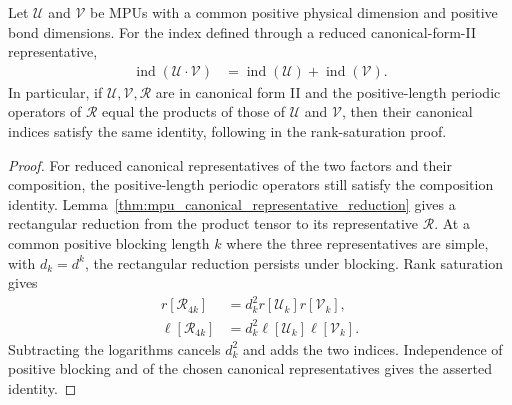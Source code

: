 \begin{lemma}
    \label{thm:mpu_admissible_index_composition}
    \leanok
    Let $\mathcal U$ and $\mathcal V$ be MPUs with a common positive physical
    dimension and positive bond dimensions. For the index defined through a reduced canonical-form-II
    representative,
    \begin{align}
        \operatorname{ind}(\mathcal U\mathbin{\cdot}\mathcal V)
         & =\operatorname{ind}(\mathcal U)+\operatorname{ind}(\mathcal V).
    \end{align}
    In particular, if $\mathcal U,\mathcal V,\mathcal R$ are in canonical form
    II and the positive-length periodic operators of $\mathcal R$ equal the
    products of those of $\mathcal U$ and $\mathcal V$, then their canonical
    indices satisfy the same identity, following in \cite[Theorem~IV.6(ii)]{Cirac2017MPU} the rank-saturation
    proof.
\end{lemma}

\begin{proof}\leanok
    For reduced canonical representatives of the two factors and their
    composition, the positive-length periodic operators still satisfy the
    composition identity. Lemma~\ref{thm:mpu_canonical_representative_reduction} gives a rectangular
    reduction from the product tensor to its representative $\mathcal R$.
    At a common positive blocking length $k$ where the three
    representatives are simple, with $d_k=d^k$, the rectangular reduction
    persists under blocking. Rank saturation gives
    \begin{align}
        r[\mathcal R_{4k}]    & =d_k^2r[\mathcal U_k]r[\mathcal V_k],       \\
        \ell[\mathcal R_{4k}] & =d_k^2\ell[\mathcal U_k]\ell[\mathcal V_k].
    \end{align}
    Subtracting the logarithms cancels $d_k^2$ and adds the two indices.
    Independence of positive blocking and of the chosen canonical
    representatives gives the asserted identity.
\end{proof}

